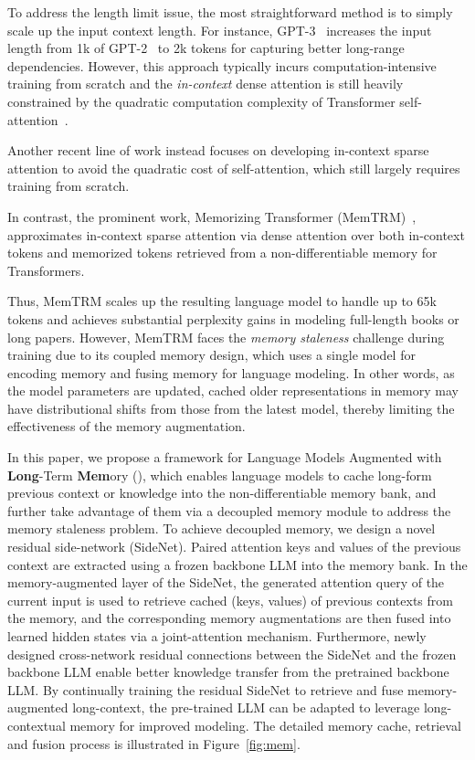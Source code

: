 To address the length limit issue, the most straightforward method is to simply scale up the input context length. For instance, GPT-3~\citep{gpt3} increases the input length from 1k of GPT-2~\citep{gpt2} to 2k tokens for capturing better long-range dependencies. However, this approach typically incurs computation-intensive training from scratch and the \textit{in-context} dense attention is still heavily constrained by the quadratic computation complexity of Transformer self-attention~\citep{Vaswani2017AttentionIA}.

Another recent line of work \cite{beltagy2020longformer,bigbird} instead focuses on developing in-context sparse attention to avoid the quadratic cost of self-attention, which still largely requires training from scratch.

In contrast, the prominent work, Memorizing Transformer (MemTRM)~\citep{Wu2022MemorizingT}, approximates in-context sparse attention via dense attention over both in-context tokens and memorized tokens retrieved from a non-differentiable memory for Transformers.

Thus, MemTRM scales up the resulting language model to handle up to 65k tokens and achieves substantial perplexity gains in modeling full-length books or long papers. However, MemTRM faces the \textit{memory staleness} challenge during training due to its coupled memory design, which uses a single model for encoding memory and fusing memory for language modeling. In other words, as the model parameters are updated, cached older representations in memory may have distributional shifts from those from the latest model, thereby limiting the effectiveness of the memory augmentation.

In this paper, we propose a framework for Language Models Augmented with \textbf{Long}-Term \textbf{Mem}ory (\our{}), which enables language models to cache long-form previous context or knowledge into the non-differentiable memory bank, and further take advantage of them via a decoupled memory module to address the memory staleness problem. To achieve decoupled memory, we design a novel residual side-network (SideNet). Paired attention keys and values of the previous context are extracted using a frozen backbone LLM into the memory bank. In the memory-augmented layer of the SideNet, the generated attention query of the current input is used to retrieve cached (keys, values) of previous contexts from the memory, and the corresponding memory augmentations are then fused into learned hidden states via a joint-attention mechanism. Furthermore, newly designed cross-network residual connections between the SideNet and the frozen backbone LLM enable better knowledge transfer from the pretrained backbone LLM. By continually training the residual SideNet to retrieve and fuse memory-augmented long-context, the pre-trained LLM can be adapted to leverage long-contextual memory for improved modeling. The detailed memory cache, retrieval and fusion process is illustrated in Figure~\ref{fig:mem}.

